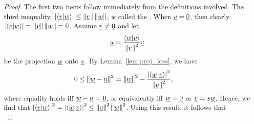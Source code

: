 \begin{proof}
The first two items follow immediately from the definitions involved.
The third inequality, $\left| \left\langle \underline{v} | \underline{w} \right\rangle \right| \leq \left\| \underline{v} \right\| \left\| \underline{w} \right\|$, is called the .
When $\underline{v} = \underline{0}$, then clearly $\left| \left\langle \underline{v} | \underline{w} \right\rangle \right| = \left\| \underline{v} \right\| \left\| \underline{w} \right\| =0$.
Assume $\underline{v} \neq \underline{0}$ and let
\begin{equation*}
\underline{u} = \frac{ \left\langle \underline{w} | \underline{v} \right\rangle}{ \left\| \underline{v} \right\|^2 } \underline{v}
\end{equation*}
be the projection $\underline{w}$ onto $\underline{v}$.
By Lemma~\ref{lem:proj_loss},
we have
\begin{align*}
0 &\leq \left\| \underline{w} - \underline{u} \right\|^2
= \left\| \underline{w} \right\|^2
- \frac{ \left| \left\langle \underline{w} | \underline{v} \right\rangle \right|^2 }
{ \left\| \underline{v} \right\|^2 } ,
\end{align*}
where equality holds iff $\underline{w}-\underline{u}=\underline{0}$, or equivalently iff $\underline{w}=\underline{0}$ or $\underline{v} = s \underline{w}$.
Hence, we find that
$\left| \left\langle \underline{v} | \underline{w} \right\rangle \right|^2 = \left| \left\langle \underline{w} | \underline{v} \right\rangle \right|^2 \leq \left\| \underline{v} \right\|^2 \left\| \underline{w} \right\|^2$.
Using this result, it follows that
\begin{equation*}

\end{equation*}
\end{proof}
